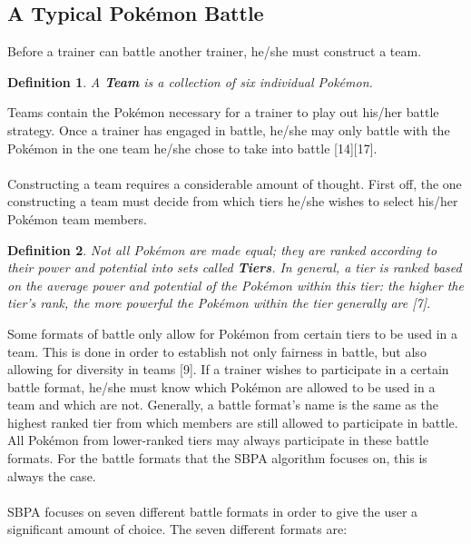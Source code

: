 \documentclass{article}
\newtheorem{definition}{Definition}
\begin{document}
\subsection{A Typical Pok\'emon Battle}\label{BattleFormatSection}
Before a trainer can battle another trainer, he/she must construct a team. 
\begin{definition}
	A \textbf{Team} is a collection of six individual Pok\'emon.
\end{definition}
Teams contain the Pok\'emon necessary for a trainer to play out his/her battle strategy. Once a trainer has engaged in battle, he/she may only battle with the Pok\'emon in the one team he/she chose to take into battle [14][17].\\\\
Constructing a team requires a considerable amount of thought. First off, the one constructing a team must decide from which tiers he/she wishes to select his/her Pok\'emon team members.
\begin{definition}\label{tierdef}
	Not all Pok\'emon are made equal; they are ranked according to their power and potential into sets called \textbf{Tiers}. In general, a tier is ranked based on the average power and potential of the Pok\'emon within this tier: the higher the tier's rank, the more powerful the Pok\'emon within the tier generally are [7].
\end{definition} 
Some formats of battle only allow for Pok\'emon from certain tiers to be used in a team. This is done in order to establish not only fairness in battle, but also allowing for diversity in teams [9]. If a trainer wishes to participate in a certain battle format, he/she must know which Pok\'emon are allowed to be used in a team and which are not. Generally, a battle format's name is the same as the highest ranked tier from which members are still allowed to participate in battle. All Pok\'emon from lower-ranked tiers may always participate in these battle formats. For the battle formats that the SBPA algorithm focuses on, this is always the case.\\\\
SBPA focuses on seven different battle formats in order to give the user a significant amount of choice. The seven different formats are:
\end{document}
